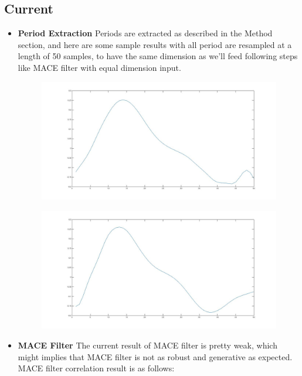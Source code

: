 \documentclass[10pt,twocolumn,letterpaper]{article}
\begin{document}
\subsection{Current}
    \begin{itemize}
    \item \textbf{Period Extraction}\newline
    Periods are extracted as described in the Method section, and here are some sample results with all period are resampled at a length of 50 samples, to have the same dimension as we’ll feed following steps like MACE filter with equal dimension input.

\begin{figure}[t]
\begin{center}
   \includegraphics[width=0.8\linewidth]{../img/fig8.jpg}
   \caption{}
\end{center}
\end{figure}

\begin{figure}[t]
\begin{center}
   \includegraphics[width=0.8\linewidth]{../img/fig9.jpg}
   \caption{}
\end{center}
\end{figure}
\item \textbf{MACE Filter}\newline
The current result of MACE filter is pretty weak, which might implies that MACE filter is not as robust and generative as expected. MACE filter correlation result is as follows:


\end{itemize}
\end{document}
